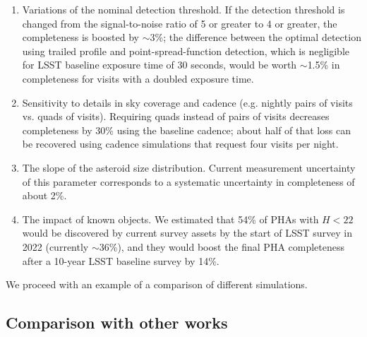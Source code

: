 \begin{enumerate}
\item Variations of the nominal detection threshold. If the detection threshold is changed from the
          signal-to-noise ratio of 5 or greater to 4 or greater, the completeness is boosted by $\sim$3\%;
          the difference between the optimal detection using trailed profile and point-spread-function
          detection, which is negligible for LSST baseline exposure time of 30 seconds, would be worth $\sim$1.5\%
          in completeness for visits with a doubled exposure time.
\item Sensitivity to details in sky coverage and cadence (e.g. nightly pairs of visits vs. quads of visits).
          Requiring quads instead of pairs of visits decreases completeness by 30\% using the baseline cadence;
          about half of that loss can be recovered using cadence simulations that request four visits per night.
\item The slope of the asteroid size distribution. Current measurement uncertainty of this parameter
          corresponds to a systematic uncertainty in completeness of about 2\%.
\item The impact of known objects. We estimated that 54\% of PHAs with $H<22$ would be discovered
          by current survey assets by the start of LSST survey in 2022 (currently $\sim$36\%), and they would
          boost the final PHA completeness after a 10-year LSST baseline survey by 14\%.
\end{enumerate}

We proceed with an example of a comparison of different simulations.

\subsection{Comparison with other works  \label{sec:other}}

